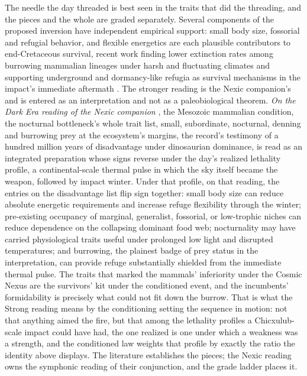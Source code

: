 The needle the day threaded is best seen in the traits that did the
threading, and the pieces and the whole are graded separately. Several
components of the proposed inversion have independent empirical
support: small body size, fossorial and refugial behavior, and flexible
energetics are each plausible contributors to end-Cretaceous survival,
recent work finding lower extinction rates among burrowing mammalian
lineages under harsh and fluctuating climates \cite{Burrow25} and
supporting underground and dormancy-like refugia as survival
mechanisms in the impact's immediate aftermath \cite{During22}. The
stronger reading is the Nexic companion's and is entered as an
interpretation and not as a paleobiological theorem. \emph{On the Dark
Era reading of the Nexic companion} \cite{Nexus}, the Mesozoic
mammalian condition, the nocturnal bottleneck's whole trait list,
small, subordinate, nocturnal, denning and burrowing prey at the
ecosystem's margins, the record's testimony of a hundred million years
of disadvantage under dinosaurian dominance, is read as an integrated
preparation whose signs reverse under the day's realized lethality
profile, a continental-scale thermal pulse in which the sky itself
became the weapon, followed by impact winter. Under that profile, on
that reading, the entries on the disadvantage list flip sign together:
small body size can reduce absolute energetic requirements and increase
refuge flexibility through the winter; pre-existing occupancy of marginal,
generalist, fossorial, or low-trophic niches can reduce dependence on the
collapsing dominant food web; nocturnality may have carried physiological
traits useful under prolonged low light and disrupted temperatures; and
burrowing, the plainest badge of prey status in the interpretation, can
provide refuge substantially shielded from the immediate thermal pulse. The traits
that marked the mammals' inferiority under the Cosmic Nexus are the
survivors' kit under the conditioned event, and the incumbents'
formidability is precisely what could not fit down the burrow. That is
what the Strong reading means by the conditioning setting the sequence
in motion: not that anything aimed the fire, but that among the
lethality profiles a Chicxulub-scale impact could have had, the one
realized is one under which a weakness was a strength, and the
conditioned law weights that profile by exactly the ratio the identity
above displays. The literature establishes the pieces; the Nexic
reading owns the symphonic reading of their conjunction, and the grade
ladder places it.

